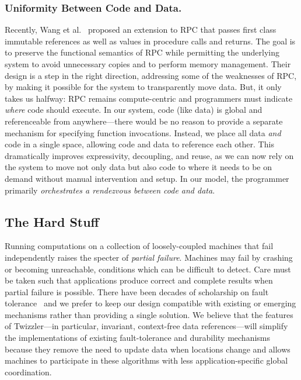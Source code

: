     \subsubsection{Uniformity Between Code and Data.}
    Recently, Wang et al.~\cite{wang:hotos21} proposed an extension to RPC
    that passes first class immutable references as well
    as values in procedure calls and returns.  The goal is to preserve the
    functional semantics of RPC while permitting the underlying system to
    avoid unnecessary copies and to perform memory management.  Their
    design is a step in the right direction, addressing some of the
    weaknesses of RPC, by making it possible for the system
    to transparently move data.  But, it only takes us halfway: RPC remains
    compute-centric and programmers must indicate
    \emph{where} code should execute.
    In our system, code (like data) is global
    and referenceable from anywhere---there would be no reason to provide a
    separate mechanism for specifying function invocations. Instead, we
    place all data \emph{and} code in a single space, allowing code
    and data to reference each other. This dramatically improves
    expressivity, decoupling, and reuse, as we can now rely on the system
    to move not only data but also code to where it needs to be on demand
    without manual intervention and setup. In our model, the programmer
    primarily \emph{orchestrates a rendezvous between code and data}.


    \subsection{The Hard Stuff}

    Running computations on a collection of loosely-coupled machines that fail independently raises the specter of
    \emph{partial failure}.  Machines may fail by crashing or becoming unreachable, conditions which
    can be difficult to detect. Care must be taken such that applications produce correct and complete
    results when partial failure is possible.  There have been decades of scholarship on
    fault tolerance~\cite{gray-dbos,3pc,bully,whydo,primary-site, primary-copy, thomas-quorum,paxos,zab}
    and we prefer to keep our design compatible with existing or emerging mechanisms rather than providing a single solution.
    We believe that the features of Twizzler---in particular, invariant, context-free data references---will simplify the implementations
    of existing fault-tolerance and durability mechanisms because they remove the need to update data
    when locations change and allows machines to participate in these algorithms with less
    application-specific global coordination.

